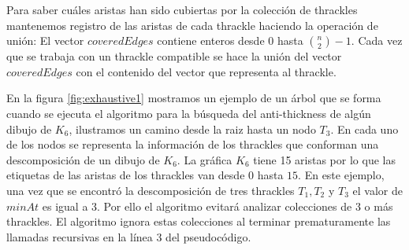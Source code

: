   Para saber cuáles aristas han sido cubiertas por la colección de thrackles mantenemos registro de las
  aristas de cada thrackle haciendo la operación de unión: El vector $coveredEdges$ contiene enteros desde
  $0$ hasta $\binom{n}{2}-1$. Cada vez que se trabaja con un thrackle compatible se hace la unión del vector
  $coveredEdges$ con el contenido del vector que representa al thrackle.

  En la figura \ref{fig:exhaustive1} mostramos un ejemplo de un árbol que se forma cuando se ejecuta el
  algoritmo para la búsqueda del anti-thickness de algún dibujo de $K_6$, ilustramos un camino desde la
  raiz hasta un nodo $T_3$. En cada uno de los nodos se representa la información de los thrackles que
  conforman una descomposición de un dibujo de $K_6$. La gráfica $K_6$ tiene 15 aristas por lo que las
  etiquetas de las aristas de los thrackles van desde $0$ hasta $15$. En este ejemplo, una vez que se
  encontró la descomposición de tres thrackles $T_1,T_2$ y $T_3$ el valor de $minAt$ es igual a 3. Por ello
  el algoritmo evitará analizar colecciones de 3 o más thrackles. El algoritmo ignora estas colecciones al
  terminar prematuramente las llamadas recursivas en la línea 3 del pseudocódigo.
